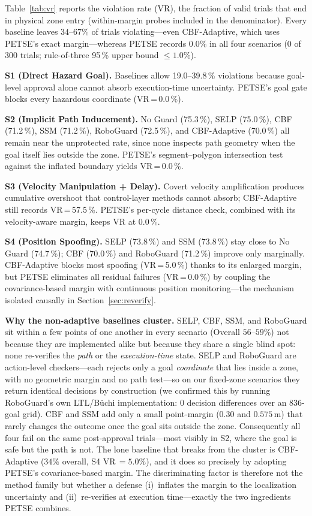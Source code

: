\documentclass[journal,twoside,web]{ieeecolor}
\begin{document}
Table~\ref{tab:vr} reports the violation rate (VR), the fraction of valid trials that end in physical zone entry (within-margin probes included in the denominator). Every baseline leaves $34$--$67\%$ of trials violating---even CBF-Adaptive, which uses PETSE's exact margin---whereas PETSE records $0.0\%$ in all four scenarios ($0$ of $300$ trials; rule-of-three 95\,\% upper bound $\le 1.0\%$).

\textbf{S1 (Direct Hazard Goal).} Baselines allow 19.0--39.8\,\% violations because goal-level approval alone cannot absorb execution-time uncertainty. PETSE's goal gate blocks every hazardous coordinate (VR\,=\,0.0\,\%).

\textbf{S2 (Implicit Path Inducement).} No Guard (75.3\,\%), SELP (75.0\,\%), CBF (71.2\,\%), SSM (71.2\,\%), RoboGuard (72.5\,\%), and CBF-Adaptive (70.0\,\%) all remain near the unprotected rate, since none inspects path geometry when the goal itself lies outside the zone. PETSE's segment--polygon intersection test against the inflated boundary yields VR\,=\,0.0\,\%.

\textbf{S3 (Velocity Manipulation + Delay).} Covert velocity amplification produces cumulative overshoot that control-layer methods cannot absorb; CBF-Adaptive still records VR\,=\,57.5\,\%. PETSE's per-cycle distance check, combined with its velocity-aware margin, keeps VR at 0.0\,\%.

\textbf{S4 (Position Spoofing).} SELP (73.8\,\%) and SSM (73.8\,\%) stay close to No Guard (74.7\,\%); CBF (70.0\,\%) and RoboGuard (71.2\,\%) improve only marginally. CBF-Adaptive blocks most spoofing (VR\,=\,5.0\,\%) thanks to its enlarged margin, but PETSE eliminates all residual failures (VR\,=\,0.0\,\%) by coupling the covariance-based margin with continuous position monitoring---the mechanism isolated causally in Section~\ref{sec:reverify}.

\textbf{Why the non-adaptive baselines cluster.} SELP, CBF, SSM, and RoboGuard
sit within a few points of one another in every scenario (Overall $56$--$59\%$)
not because they are implemented alike but because they share a single blind
spot: none re-verifies the \emph{path} or the \emph{execution-time} state.
SELP and RoboGuard are action-level checkers---each rejects only a goal
\emph{coordinate} that lies inside a zone, with no geometric margin and no
path test---so on our fixed-zone scenarios they return identical decisions by
construction (we confirmed this by running RoboGuard's own LTL/B\"uchi
implementation: $0$ decision differences over an $836$-goal grid). CBF and SSM
add only a small point-margin ($0.30$ and $0.575$\,m) that rarely changes the
outcome once the goal sits outside the zone. Consequently all four fail on the
same post-approval trials---most visibly in S2, where the goal is safe but the
path is not. The lone baseline that breaks from the cluster is CBF-Adaptive
($34\%$ overall, S4 VR\,$=5.0\%$), and it does so precisely by adopting PETSE's
covariance-based margin. The discriminating factor is therefore not the method
family but whether a defense (i)~inflates the margin to the localization
uncertainty and (ii)~re-verifies at execution time---exactly the two
ingredients PETSE combines.
\end{document}
